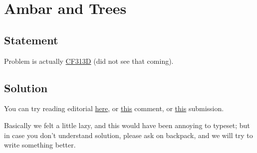 \section{Ambar and Trees}
	\subsection{Statement}
	Problem is actually
	\href{http://codeforces.com/problemset/problem/313/D}{CF313D}
	(did not see that coming).

	\subsection{Solution}
	You can try reading editorial
	\href{http://codeforces.com/blog/entry/7826}{here},
	or 
	\href{http://codeforces.com/blog/entry/7826?#comment-135797}{this}
	comment, or
	\href{http://codeforces.com/contest/313/submission/15502607}{this}
	submission.

	Basically we felt a little lazy, and this would have been annoying
	to typeset; but in case you don't understand solution, please ask
	on backpack, and we will try to write something better.
